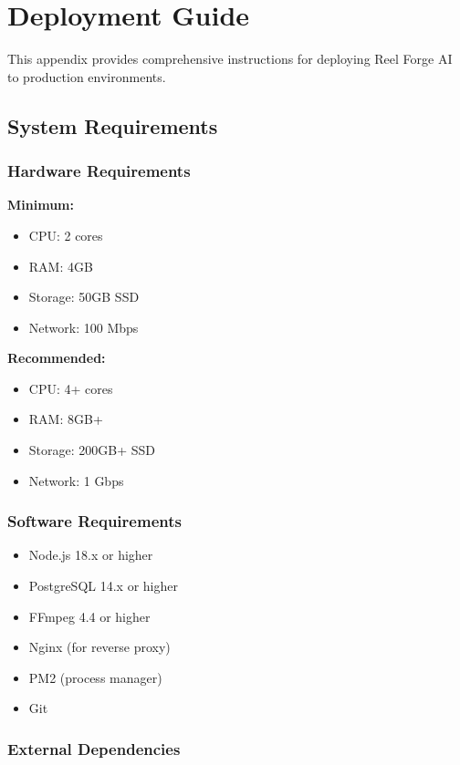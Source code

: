 \chapter{Deployment Guide}
\label{appendix:deployment}

This appendix provides comprehensive instructions for deploying Reel Forge AI to production environments.

\section{System Requirements}

\subsection{Hardware Requirements}

\textbf{Minimum:}
\begin{itemize}
    \item CPU: 2 cores
    \item RAM: 4GB
    \item Storage: 50GB SSD
    \item Network: 100 Mbps
\end{itemize}

\textbf{Recommended:}
\begin{itemize}
    \item CPU: 4+ cores
    \item RAM: 8GB+
    \item Storage: 200GB+ SSD
    \item Network: 1 Gbps
\end{itemize}

\subsection{Software Requirements}

\begin{itemize}
    \item Node.js 18.x or higher
    \item PostgreSQL 14.x or higher
    \item FFmpeg 4.4 or higher
    \item Nginx (for reverse proxy)
    \item PM2 (process manager)
    \item Git
\end{itemize}

\subsection{External Dependencies}

